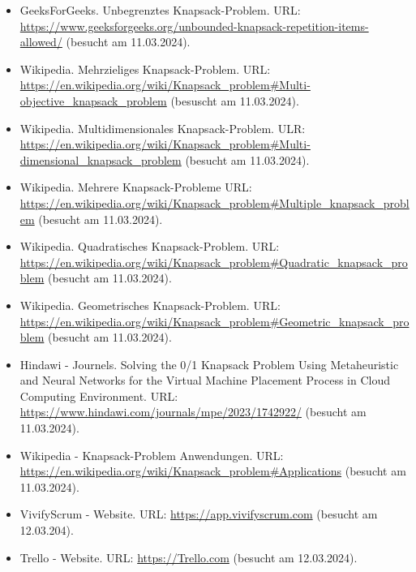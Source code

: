 \begin{itemize}
    \item GeeksForGeeks. Unbegrenztes Knapsack-Problem. URL: \url{https://www.geeksforgeeks.org/unbounded-knapsack-repetition-items-allowed/} (besucht am 11.03.2024).
    \item Wikipedia. Mehrzieliges Knapsack-Problem. URL: \url{https://en.wikipedia.org/wiki/Knapsack_problem#Multi-objective_knapsack_problem} (besuscht am 11.03.2024).
    \item Wikipedia. Multidimensionales Knapsack-Problem. ULR: \url{https://en.wikipedia.org/wiki/Knapsack_problem#Multi-dimensional_knapsack_problem} (besucht am 11.03.2024).
    \item Wikipedia. Mehrere Knapsack-Probleme URL: \url{https://en.wikipedia.org/wiki/Knapsack_problem#Multiple_knapsack_problem} (besucht am 11.03.2024).
    \item Wikipedia. Quadratisches Knapsack-Problem. URL: \url{https://en.wikipedia.org/wiki/Knapsack_problem#Quadratic_knapsack_problem} (besucht am 11.03.2024).
    \item Wikipedia. Geometrisches Knapsack-Problem. URL: \url{https://en.wikipedia.org/wiki/Knapsack_problem#Geometric_knapsack_problem} (besucht am 11.03.2024).
    \item Hindawi - Journels. Solving the 0/1 Knapsack Problem Using Metaheuristic and Neural Networks for the Virtual Machine Placement Process in Cloud Computing Environment. URL: \url{https://www.hindawi.com/journals/mpe/2023/1742922/} (besucht am 11.03.2024).
    \item Wikipedia - Knapsack-Problem Anwendungen. URL: \url{https://en.wikipedia.org/wiki/Knapsack_problem#Applications} (besucht am 11.03.2024).
    \item VivifyScrum - Website. URL: \url{https://app.vivifyscrum.com} (besucht am 12.03.204).
    \item Trello - Website. URL: \url{https://Trello.com} (besucht am 12.03.2024).
\end{itemize}





